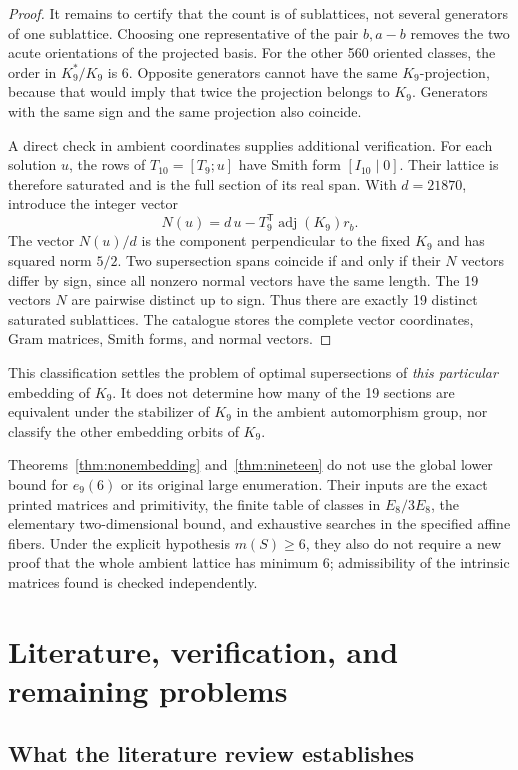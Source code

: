 \documentclass[11pt,a4paper]{article}
\theoremstyle{remark}\newtheorem{remark}[theorem]{Remark}
\begin{document}
\begin{proof}
It remains to certify that the count is of sublattices, not several generators of one sublattice. Choosing one representative of the pair $b,a-b$ removes the two acute orientations of the projected basis. For the other 560 oriented classes, the order in $K_9^*/K_9$ is 6. Opposite generators cannot have the same $K_9$-projection, because that would imply that twice the projection belongs to $K_9$. Generators with the same sign and the same projection also coincide.

A direct check in ambient coordinates supplies additional verification. For each solution $u$, the rows of $T_{10}=[T_9;u]$ have Smith form $[I_{10}\mid0]$. Their lattice is therefore saturated and is the full section of its real span. With $d=21870$, introduce the integer vector
\[
N(u)=d\,u-T_9^{\mathsf T}\operatorname{adj}(K_9)r_b.
\]
The vector $N(u)/d$ is the component perpendicular to the fixed $K_9$ and has squared norm $5/2$. Two supersection spans coincide if and only if their $N$ vectors differ by sign, since all nonzero normal vectors have the same length. The 19 vectors $N$ are pairwise distinct up to sign. Thus there are exactly 19 distinct saturated sublattices. The catalogue stores the complete vector coordinates, Gram matrices, Smith forms, and normal vectors.
\end{proof}

This classification settles the problem of optimal supersections of \emph{this particular} embedding of $K_9$. It does not determine how many of the 19 sections are equivalent under the stabilizer of $K_9$ in the ambient automorphism group, nor classify the other embedding orbits of $K_9$.

Theorems~\ref{thm:nonembedding} and~\ref{thm:nineteen} do not use the global lower bound for $e_9(6)$ or its original large enumeration. Their inputs are the exact printed matrices and primitivity, the finite table of classes in $E_8/3E_8$, the elementary two-dimensional bound, and exhaustive searches in the specified affine fibers. Under the explicit hypothesis $m(S)\ge6$, they also do not require a new proof that the whole ambient lattice has minimum 6; admissibility of the intrinsic matrices found is checked independently.

\section{Literature, verification, and remaining problems}

\subsection{What the literature review establishes}
\end{document}
